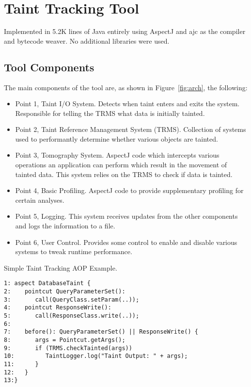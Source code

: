 \documentclass[msc,oneside]{ubcthesis}
\begin{document}
\section{Taint Tracking Tool}
Implemented in 5.2K lines of Java entirely using AspectJ and ajc as the compiler and bytecode weaver. No additional libraries were used.

\subsection{Tool Components}
The main components of the tool are, as shown in Figure~\ref{fig:arch}, the following:
\begin{itemize}
\item Point 1, Taint I/O System. Detects when taint enters and exits the system. Responsible for telling the TRMS what data is initially tainted.
\item Point 2, Taint Reference Management System (TRMS). Collection of systems used to performantly determine whether various objects are tainted.
\item Point 3, Tomography System. AspectJ code which intercepts various operations an application can perform which result in the movement of tainted data. This system relies on the TRMS to check if data is tainted.
\item Point 4, Basic Profiling. AspectJ code to provide supplementary profiling for certain analyses.
\item Point 5, Logging. This system receives updates from the other components and logs the information to a file.
\item Point 6, User Control. Provides some control to enable and disable various systems to tweak runtime performance. 
\end{itemize}

\begin{Program}
  \caption{\label{prog:aspect} Simple Taint Tracking AOP Example.}
\begin{verbatim}
1: aspect DatabaseTaint {
2:    pointcut QueryParameterSet(): 
3:       call(QueryClass.setParam(..));
4:    pointcut ResponseWrite():
5:       call(ResponseClass.write(..));
6:
7:    before(): QueryParameterSet() || ResponseWrite() {
8:       args = Pointcut.getArgs();
9:       if (TRMS.checkTainted(args))
10:         TaintLogger.log("Taint Output: " + args);
11:      }
12:   }
13:}
\end{verbatim}
\end{Program}
\end{document}

